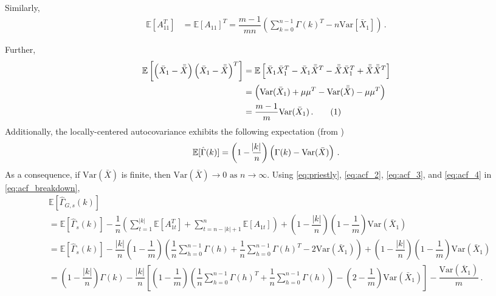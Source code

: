 \documentclass[11pt]{article}
\newcommand{\E}{\mathbb{E}}
\newcommand{\Var}{\text{Var}}
\newcommand\numberthis{\addtocounter{equation}{1}\tag{\theequation}}
\theoremstyle{remark}
\begin{document}
%
Similarly,
%    
\begin{align}
\label{eq:acf_3}
    \mathbb{E} \left[ A_{11}^T \right] &= \mathbb{E}\left[ A_{11}\right]^T = \dfrac{m-1}{mn}\left(\sum_{k=0}^{n-1}\Gamma(k)^T - n\text{Var}\left[\bar{X}_1 \right] \right)\,.
\end{align}


Further,
\begin{align*}
\mathbb{E}\left[ \left(\bar{X}_{1} - \bar{\bar{X}} \right)  \left(\bar{X}_{1} - \bar{\bar{X}} \right)^{T}\right] &= \mathbb{E}\left[ \bar{X}_{1}\bar{X}_{1}^{T} - \bar{X}_{1}\bar{\bar{X}}^{T} - \bar{\bar{X}} \bar{X}_{1}^{T} + \bar{\bar{X}}\bar{\bar{X}}^{T}\right]\\
&= \left(\Var(\bar{X}_{1}) + \mu\mu^{T} - \Var(\bar{\bar{X}}) - \mu\mu^{T}\right)\\
&= \dfrac{m-1}{m}\Var(\bar{X}_1)\,. \numberthis \label{eq:acf_4}
\end{align*}
%
Additionally, the locally-centered autocovariance exhibits the following expectation (from \cite{priestley1981spectral})
 \begin{equation} \label{eq:priestly}
     \mathbb{E}[\hat{\Gamma}(k)] = \left(1- \dfrac{\abs{k}}{n}\right)\left(\Gamma(k) - \Var{(\bar{X})}
 \right)\,.
 \end{equation}
%
As a consequence, if $\Var(\bar{X})$ is finite, then $\Var(\bar{X}) \to 0 \textrm{ as } n \to \infty$.
Using \eqref{eq:priestly}, \eqref{eq:acf_2}, \eqref{eq:acf_3}, and \eqref{eq:acf_4} in \eqref{eq:acf_breakdown},
\begin{align*}
    & \E \left[\hat{\Gamma}_{G,s}(k) \right] \\
    &= \mathbb{E}\left[\hat{\Gamma}_{s}(k)\right] - \dfrac{1}{n} \left(\sum\limits_{t=1}^{|k|}\mathbb{E}[A_{1t}^T] + \sum\limits_{t=n-|k|+1}^{n}\mathbb{E}[A_{1t}]\right) + \left(1- \dfrac{|k|}{n}\right)\left(1-\dfrac{1}{m}\right)\Var(\bar{X}_1)\\
    &= \mathbb{E}\left[\hat{\Gamma}_{s}(k)\right] - \dfrac{|k|}{n}\left(1-\dfrac{1}{m}\right)\left(\dfrac{1}{n}\sum_{h=0}^{n-1}\Gamma(h) + \dfrac{1}{n}\sum_{h=0}^{n-1}\Gamma(h)^T - 2 \Var(\bar{X}_1)\right) + \left(1- \dfrac{|k|}{n}\right)\left(1-\dfrac{1}{m}\right)\Var(\bar{X}_1)\\
    &= \left(1- \dfrac{|k|}{n}\right)\Gamma(k) - \dfrac{|k|}{n}\left[\left(1-\dfrac{1}{m}\right)\left(\dfrac{1}{n}\sum_{h=0}^{n-1}\Gamma(h)^T + \dfrac{1}{n}\sum_{h=0}^{n-1}\Gamma(h)\right) - \left(2-\dfrac{1}{m}\right) \Var(\bar{X}_1)\right] - \dfrac{\Var(\overline{X}_1)}{m}\,.
\end{align*}
%
\end{document}
